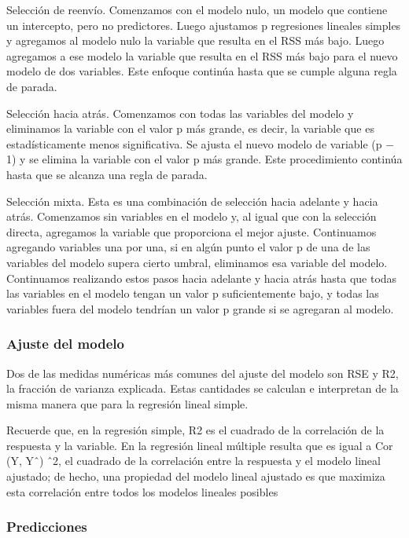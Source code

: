 \documentclass[
  letterpaper,
  DIV=11,
  numbers=noendperiod]{scrartcl}
\begin{document}
Selección de reenvío. Comenzamos con el modelo nulo, un modelo que
contiene un intercepto, pero no predictores. Luego ajustamos p
regresiones lineales simples y agregamos al modelo nulo la variable que
resulta en el RSS más bajo. Luego agregamos a ese modelo la variable que
resulta en el RSS más bajo para el nuevo modelo de dos variables. Este
enfoque continúa hasta que se cumple alguna regla de parada.

Selección hacia atrás. Comenzamos con todas las variables del modelo y
eliminamos la variable con el valor p más grande, es decir, la variable
que es estadísticamente menos significativa. Se ajusta el nuevo modelo
de variable (p − 1) y se elimina la variable con el valor p más grande.
Este procedimiento continúa hasta que se alcanza una regla de parada.

Selección mixta. Esta es una combinación de selección hacia adelante y
hacia atrás. Comenzamos sin variables en el modelo y, al igual que con
la selección directa, agregamos la variable que proporciona el mejor
ajuste. Continuamos agregando variables una por una, si en algún punto
el valor p de una de las variables del modelo supera cierto umbral,
eliminamos esa variable del modelo. Continuamos realizando estos pasos
hacia adelante y hacia atrás hasta que todas las variables en el modelo
tengan un valor p suficientemente bajo, y todas las variables fuera del
modelo tendrían un valor p grande si se agregaran al modelo.

\hypertarget{ajuste-del-modelo}{%
\subsubsection{\texorpdfstring{\textbf{Ajuste del
modelo}}{Ajuste del modelo}}\label{ajuste-del-modelo}}

Dos de las medidas numéricas más comunes del ajuste del modelo son RSE y
R2, la fracción de varianza explicada. Estas cantidades se calculan e
interpretan de la misma manera que para la regresión lineal simple.

Recuerde que, en la regresión simple, R2 es el cuadrado de la
correlación de la respuesta y la variable. En la regresión lineal
múltiple resulta que es igual a Cor (Y, Yˆ) ˆ2, el cuadrado de la
correlación entre la respuesta y el modelo lineal ajustado; de hecho,
una propiedad del modelo lineal ajustado es que maximiza esta
correlación entre todos los modelos lineales posibles

\hypertarget{predicciones}{%
\subsubsection{\texorpdfstring{\textbf{Predicciones}}{Predicciones}}\label{predicciones}}
\end{document}
